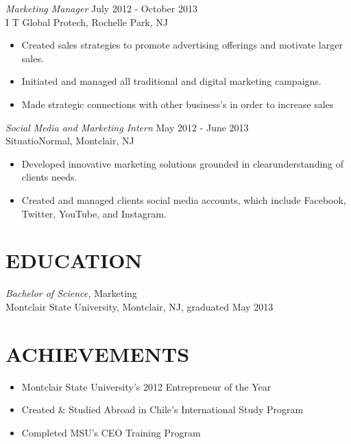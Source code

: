 \documentclass[margin]{res}
\begin{document}
\begin{resume}
                {\sl Marketing Manager} \hfill July 2012 - October 2013 \\
                I T Global Protech, Rochelle Park, NJ
                 \begin{itemize}  \itemsep -2pt %
                 \item Created sales strategies to promote advertising offerings and motivate larger sales.
                 \item Initiated and managed all traditional and digital marketing campaigns.
                 \item Made strategic connections with other business's in order to increase sales
                 \end{itemize}
                 
               {\sl Social Media and Marketing Intern} \hfill            May 2012 - June 2013 \\
                SituatioNormal, Montclair, NJ
                 \begin{itemize}  \itemsep -2pt %
                 \item Developed innovative marketing solutions grounded in clearunderstanding of clients needs.
                 \item Created and managed clients social media accounts, which include Facebook, Twitter,
                 YouTube, and Instagram.
                 \end{itemize} 
 
\section{EDUCATION} {\sl Bachelor of Science,} Marketing \\
                Montclair State University, Montclair, NJ, 
                graduated May 2013 \vspace{0.1pt}
\section{ACHIEVEMENTS}
\begin{itemize} 

		\item Montclair State University's 2012 Entrepreneur of the Year
		\item Created \& Studied Abroad in Chile's International Study Program
		\item Completed MSU's CEO Training Program 
					                
					                 
\end{itemize}

\end{resume}
\end{document}
